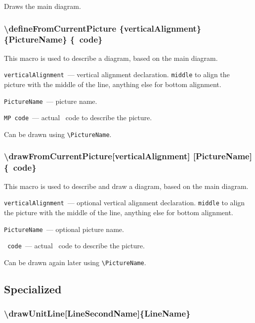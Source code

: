 	Draws the main diagram.




\subsubsection{\textbackslash defineFromCurrentPicture \{verticalAlignment\} \{PictureName\} \{\METAPOST\ code\}}

	This macro is used to describe a diagram, based on the main diagram.

	\texttt{verticalAlignment}~— vertical alignment declaration. \texttt{middle} to align the picture with the middle of the line, anything else for bottom alignment.

	\texttt{PictureName}~— picture name.

	\texttt{MP code}~— actual \METAPOST\ code to describe the picture.
	
	Can be drawn using \texttt{\textbackslash PictureName}.
	
\subsubsection{\textbackslash drawFromCurrentPicture[verticalAlignment] [PictureName] \{\METAPOST\ code\}}

	This macro is used to describe and draw a diagram, based on the main diagram.

	\texttt{verticalAlignment}~— optional vertical alignment declaration. \texttt{middle} to align the picture with the middle of the line, anything else for bottom alignment.

	\texttt{PictureName}~— optional picture name.

	\texttt{\METAPOST\ code}~— actual \METAPOST\ code to describe the picture.
	
	Can be drawn again later using \texttt{\textbackslash PictureName}.


\subsection{Specialized}

\subsubsection{\textbackslash drawUnitLine[LineSecondName]\{LineName\}}

